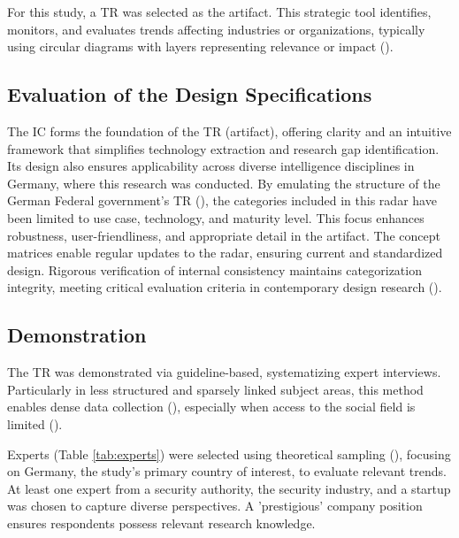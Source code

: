 \documentclass[10pt]{article}
\begin{document}
For this study, a TR was selected as the artifact. This strategic tool identifies, monitors, and evaluates trends affecting industries or organizations, typically using circular diagrams with layers representing relevance or impact (\cite{wulfmettbrenn2017}).

\subsection{Evaluation of the Design Specifications}
The IC forms the foundation of the TR (artifact), offering clarity and an intuitive framework that simplifies technology extraction and research gap identification. Its design also ensures applicability across diverse intelligence disciplines in Germany, where this research was conducted. By emulating the structure of the German Federal government's TR (\cite{Stich.2022}), the categories included in this radar have been limited to use case, technology, and maturity level. This focus enhances robustness, user-friendliness, and appropriate detail in the artifact. The concept matrices enable regular updates to the radar, ensuring current and standardized design. Rigorous verification of internal consistency maintains categorization integrity, meeting critical evaluation criteria in contemporary design research (\cite{vomBrocke.2020b}).


\subsection{Demonstration}
The TR was demonstrated via guideline-based, systematizing expert interviews. Particularly in less structured and sparsely linked subject areas, this method enables dense data collection (\cite{Meuser.1991}), especially when access to the social field is limited (\cite{Glaser.2009}).

Experts (Table \ref{tab:experts}) were selected using theoretical sampling (\cite{Glaser.1967}), focusing on Germany, the study's primary country of interest, to evaluate relevant trends. At least one expert from a security authority, the security industry, and a startup was chosen to capture diverse perspectives. A 'prestigious' company position ensures respondents possess relevant research knowledge.
\end{document}
